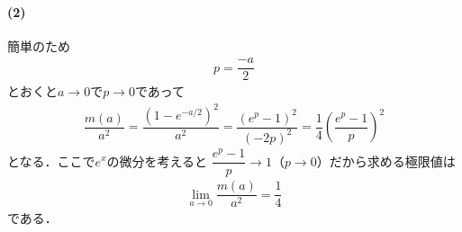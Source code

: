 \documentclass[../../main.tex]{subfiles}
\begin{document}
\paragraph{(2)}
簡単のため
\begin{align}
  p = \dfrac{-a}{2}
\end{align}
とおくと$a\to0$で$p\to0$であって
\begin{align}
  \dfrac{m(a)}{a^2}=\dfrac{\left(1-e^{-a/2}\right)^2}{a^2}=\dfrac{\left(e^{p}-1\right)^2}{(-2p)^2}=\dfrac{1}{4}\left(\dfrac{e^p-1}{p}\right)^2
\end{align}
となる．ここで$e^{x}$の微分を考えると
$\dfrac{e^p-1}{p}\to1$（$p\to0$）だから求める極限値は
\begin{align}
  \lim_{a\to0}\dfrac{m(a)}{a^2}=\dfrac{1}{4}
\end{align}
である．

\newpage
\end{document}
